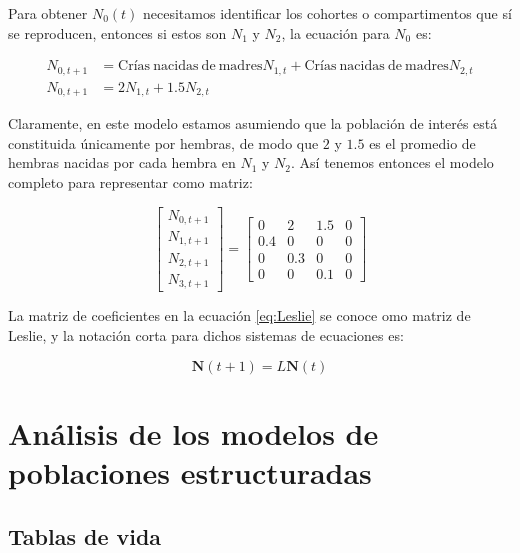 \documentclass[
]{book}
\begin{document}
Para obtener \(N_0(t)\) necesitamos identificar los cohortes o compartimentos que sí se reproducen, entonces si estos son \(N_1\) y \(N_2\), la ecuación para \(N_0\) es:

\begin{align}
N_{0, t+1} &= \mathrm{Crías\ nacidas\ de\ madres} N_{1, t} + \mathrm{Crías\ nacidas\ de\ madres} N_{2, t} \\
N_{0, t+1} &= 2 N_{1, t} + 1.5 N_{2, t}
\end{align}

Claramente, en este modelo estamos asumiendo que la población de interés está constituida únicamente por hembras, de modo que \(2\) y \(1.5\) es el promedio de hembras nacidas por cada hembra en \(N_1\) y \(N_2\). Así tenemos entonces el modelo completo para representar como matriz:

\begin{equation}
\left[\begin{array}{c}
N_{0, t+1} \\ N_{1, t+1} \\ N_{2, t+1} \\ N_{3, t+1}
\end{array}\right] =
\left[ 
\begin{array}{cccc}
0 & 2 & 1.5 & 0 \\
0.4 & 0 & 0 & 0 \\
0  & 0.3& 0 & 0 \\
0  & 0 & 0.1& 0
\end{array}
\right] \label{eq:Leslie}
\end{equation}

La matriz de coeficientes en la ecuación \eqref{eq:Leslie} se conoce omo matriz de Leslie, y la notación corta para dichos sistemas de ecuaciones es:

\[\mathbf{N}(t+1) = L \mathbf{N}(t)\]

\hypertarget{anuxe1lisis-de-los-modelos-de-poblaciones-estructuradas}{%
\section{Análisis de los modelos de poblaciones estructuradas}\label{anuxe1lisis-de-los-modelos-de-poblaciones-estructuradas}}

\hypertarget{tablas-de-vida}{%
\subsection{Tablas de vida}\label{tablas-de-vida}}
\end{document}
